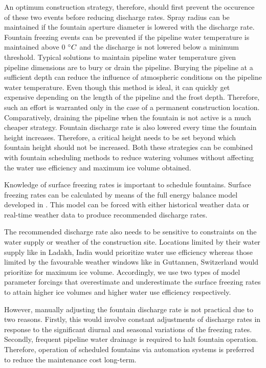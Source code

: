 \documentclass[tc, manuscript]{copernicus}
\begin{document}
An optimum construction strategy, therefore, should first prevent the occurence of these two events before
reducing discharge rates. Spray radius can be maintained if the fountain aperture diameter is lowered with the
discharge rate. Fountain freezing events can be prevented if the pipeline water temperature is maintained above
0 $^{\circ} C$ and the discharge is not lowered below a minimum threshold. Typical solutions to maintain pipeline
water temperature given pipeline dimensions are to bury or drain the pipeline. Burying the pipeline at a
sufficient depth can reduce the influence of atmospheric conditions on the pipeline water temperature. Even
though this method is ideal, it can quickly get expensive depending on the length of the pipeline and the frost
depth. Therefore, such an effort is warranted only in the case of a permanent construction location.
Comparatively, draining the pipeline when the fountain is not active is a much cheaper strategy. Fountain
discharge rate is also lowered every time the fountain height increases. Therefore, a critical height needs to
be set beyond which fountain height should not be increased. Both these strategies can be combined with fountain
scheduling methods to reduce watering volumes without affecting the water use efficiency and maximum ice volume
obtained. 

Knowledge of surface freezing rates is important to schedule fountains. Surface freezing rates can be calculated
by means of the full energy balance model developed in
\cite{balasubramanianInfluenceMeteorologicalConditions2022}. This model can be forced with either historical
weather data or real-time weather data to produce recommended discharge rates.

The recommended discharge rate also needs to be sensitive to constraints on the water supply or weather of the
construction site. Locations limited by their water supply like in Ladakh, India would prioritize water use
efficiency whereas those limited by the favourable weather windows like in Guttannen, Switzerland  would
prioritize for maximum ice volume. Accordingly, we use two types of model parameter forcings that overestimate
and underestimate the surface freezing rates to attain higher ice volumes and higher water use efficiency
respectively. 

However, manually adjusting the fountain discharge rate is not practical due to two reasons. Firstly, this would
involve constant adjustments of discharge rates in response to the significant diurnal and seasonal variations
of the freezing rates. Secondly, frequent pipeline water drainage is required to halt fountain operation.
Therefore, operation of scheduled fountains via automation systems is preferred to reduce the maintenance cost
long-term.
\end{document}
